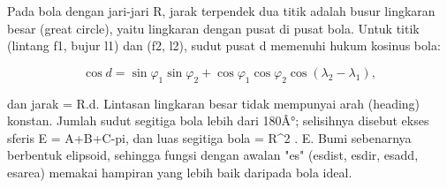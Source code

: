 \documentclass[a4paper,10pt]{article}
\begin{document}
\begin{eulernotebook}
\begin{eulercomment}
\begin{eulercomment}
\begin{eulercomment}
\begin{eulercomment}
\begin{eulercomment}
\begin{eulercomment}
\begin{eulercomment}
\begin{eulercomment}
\begin{eulercomment}
\begin{eulercomment}
\begin{eulercomment}
\begin{eulercomment}
\begin{eulercomment}
\begin{eulercomment}
\begin{eulercomment}
\begin{eulercomment}
\begin{eulercomment}
\begin{eulercomment}
\begin{eulercomment}
\end{eulercomment}
\begin{eulercomment}
Pada bola dengan jari-jari R, jarak terpendek dua titik adalah busur lingkaran besar (great
circle), yaitu lingkaran dengan pusat di pusat bola. Untuk titik (lintang f1, bujur l1) dan
(f2, l2), sudut pusat d memenuhi hukum kosinus bola:
\end{eulercomment}
\begin{eulerformula}
\[
\cos d = \sin\varphi_1\sin\varphi_2+\cos\varphi_1\cos\varphi_2\cos(\lambda_2-\lambda_1),
\]
\end{eulerformula}
\begin{eulercomment}
dan jarak = R.d. Lintasan lingkaran besar tidak mempunyai arah (heading) konstan.
Jumlah sudut segitiga bola lebih dari 180Â°; selisihnya disebut ekses sferis E = A+B+C-pi, dan
luas segitiga bola = R\textasciicircum{}2 . E. Bumi sebenarnya berbentuk elipsoid, sehingga fungsi dengan awalan
"es" (esdist, esdir, esadd, esarea) memakai hampiran yang lebih baik daripada bola ideal.


\end{eulercomment}
\end{eulercomment}
\end{eulercomment}
\end{eulercomment}
\end{eulercomment}
\end{eulercomment}
\end{eulercomment}
\end{eulercomment}
\end{eulercomment}
\end{eulercomment}
\end{eulercomment}
\end{eulercomment}
\end{eulercomment}
\end{eulercomment}
\end{eulercomment}
\end{eulercomment}
\end{eulercomment}
\end{eulercomment}
\end{eulercomment}
\end{eulernotebook}
\end{document}
